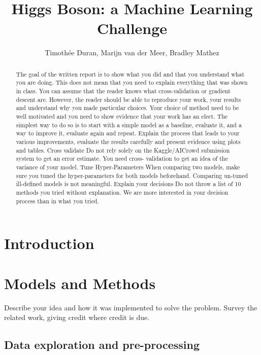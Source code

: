 \documentclass[10pt,conference,compsocconf]{IEEEtran}
\begin{document}
\title{Higgs Boson: a Machine Learning Challenge}

\author{
  Timothée Duran, Marijn van der Meer, Bradley Mathez
}

\maketitle

\begin{abstract}

 The goal of the written report is to show what you did and that you understand what you are doing. This does
not mean that you need to explain everything that was shown in class. You can assume that the reader knows
what cross-validation or gradient descent are. However, the reader should be able to reproduce your work, your
results and understand why you made particular choices. Your choice of method need to be well motivated and
you need to show evidence that your work has an elect.
The simplest way to do so is to start with a simple model as a baseline, evaluate it, and a way to improve it,
evaluate again and repeat. Explain the process that leads to your various improvements, evaluate the results
carefully and present evidence using plots and tables.
Cross validate
Do not rely solely on the Kaggle/AICrowd submission system to get an error estimate. You need cross-
validation to get an idea of the variance of your model.
Tune Hyper-Parameters
When comparing two models, make sure you tuned the hyper-parameters for both models beforehand.
Comparing un-tuned \/ ill-defined models is not meaningful.
Explain your decisions
Do not throw a list of 10 methods you tried without explanation. We are more interested in your decision
process than in what you tried.
\end{abstract}

\section{Introduction}\label{sec: introduction}

\section{Models and Methods}\label{sec: models_methods}
Describe your idea and how it was implemented to solve
  the problem. Survey the related work, giving credit where credit is
  due.
  \subsection{Data exploration and pre-processing}\label{subsec:data_cleaning}
\end{document}
